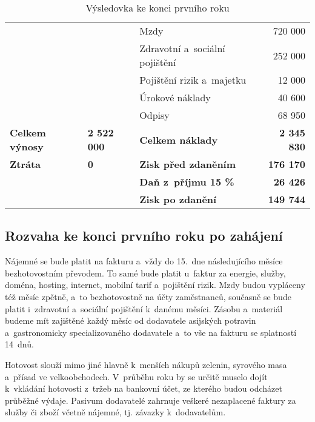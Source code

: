 \begin{table}[htbp]
\begin{center}
\begin{tabular}{lllr}
                       &                               & Mzdy\index{mzda}                           & 720 000            \\
                       &                               & Zdravotní a~sociální pojištění & 252 000            \\
                       &                               & Pojištění rizik a~majetku      & 12 000             \\
                       &                               & Úrokové náklady\index{náklad}                & 40 600             \\
                       &                               & Odpisy\index{odpis}                         & 68 950             \\ \hline
\textbf{Celkem výnosy}\index{výnos} & \textbf{2 522 000}            & \textbf{Celkem náklady\index{náklad}}        & \textbf{2 345 830} \\
\textbf{Ztráta}        & \textbf{0}                    & \textbf{Zisk před zdaněním}    & \textbf{176 170}   \\
                       &                               & \textbf{Daň z~příjmu 15 \%}    & \textbf{26 426}    \\
                       &                               & \textbf{Zisk po zdanění}       & \textbf{149 744}  
\end{tabular}
\caption{Výsledovka ke konci prvního roku}
\label{vysledovka}
\end{center}
\end{table}

\newpage

\subsection{Rozvaha ke konci prvního roku po zahájení}
Nájemné se bude platit na fakturu a~vždy do 15.~dne následujícího měsíce bezhotovostním převodem. To samé bude platit u~faktur za energie, služby, doména, hosting, internet, mobilní tarif a~pojištění rizik. Mzdy budou vypláceny též měsíc zpětně, a~to bezhotovostně na účty zaměstnanců, současně se bude platit i~zdravotní a~sociální pojištění k~danému měsíci. Zásobu a~materiál budeme mít zajištěné každý měsíc od dodavatele asijských potravin a~gastronomicky specializovaného dodavatele a~to vše na fakturu se splatností 14~dnů. 

Hotovost slouží mimo jiné hlavně k~menších nákupů zelenin, syrového masa a~přísad ve velkoobchodech. V~průběhu roku by se určitě muselo dojít k~vkládání hotovosti z~tržeb na bankovní účet, ze kterého budou odcházet průběžné výdaje. Pasivum dodavatelé zahrnuje veškeré nezaplacené faktury za služby či zboží včetně nájemné, tj. závazky k~dodavatelům.

